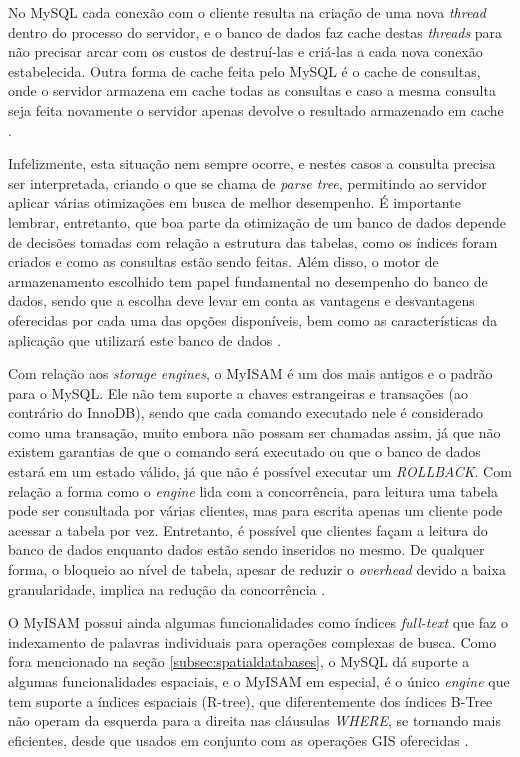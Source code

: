 \documentclass[diss]{template/setrem}
\begin{document}
No MySQL cada conexão com o cliente resulta na criação de uma nova \emph{thread} dentro do processo do servidor, e o banco de dados faz cache destas \emph{threads} para não precisar arcar com os custos de destruí-las e criá-las a cada nova conexão estabelecida. Outra forma de cache feita pelo MySQL é o cache de consultas, onde o servidor armazena em cache todas as consultas e caso a mesma consulta seja feita novamente o servidor apenas devolve o resultado armazenado em cache \citep{Schwartz2008}.

Infelizmente, esta situação nem sempre ocorre, e nestes casos a consulta precisa ser interpretada, criando o que se chama de \emph{parse tree}, permitindo ao servidor aplicar várias otimizações em busca de melhor desempenho. É importante lembrar, entretanto, que boa parte da otimização de um banco de dados depende de decisões tomadas com relação a estrutura das tabelas, como os índices foram criados e como as consultas estão sendo feitas. Além disso, o motor de armazenamento escolhido tem papel fundamental no desempenho do banco de dados, sendo que a escolha deve levar em conta as vantagens e desvantagens oferecidas por cada uma das opções disponíveis, bem como as características da aplicação que utilizará este banco de dados \citep{Schwartz2008}.

Com relação aos \emph{storage engines}, o MyISAM é um dos mais antigos e o padrão para o MySQL. Ele não tem suporte a chaves estrangeiras e transações (ao contrário do InnoDB), sendo que cada comando executado nele é considerado como uma transação, muito embora não possam ser chamadas assim, já que não existem garantias de que o comando será executado ou que o banco de dados estará em um estado válido, já que não é possível executar um \emph{ROLLBACK}. Com relação a forma como o \emph{engine} lida com a concorrência, para leitura uma tabela pode ser consultada por várias clientes, mas para escrita apenas um cliente pode acessar a tabela por vez. Entretanto, é possível que clientes façam a leitura do banco de dados enquanto dados estão sendo inseridos no mesmo. De qualquer forma, o bloqueio ao nível de tabela, apesar de reduzir o \emph{overhead} devido a baixa granularidade, implica na redução da concorrência \citep{Schwartz2008}.

O MyISAM possui ainda algumas funcionalidades como índices \emph{full-text} que faz o indexamento de palavras individuais para operações complexas de busca. Como fora mencionado na seção \ref{subsec:spatialdatabases}, o MySQL dá suporte a algumas funcionalidades espaciais, e o MyISAM em especial, é o único \emph{engine} que tem suporte a índices espaciais (R-tree), que diferentemente dos índices B-Tree não operam da esquerda para a direita nas cláusulas \emph{WHERE}, se tornando mais eficientes, desde que usados em conjunto com as operações GIS oferecidas \citep{Schwartz2008}.
\end{document}

